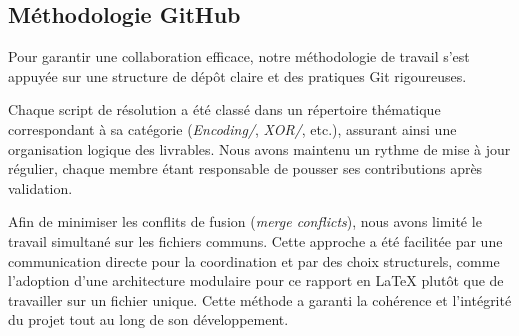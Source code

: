 \subsection{Méthodologie GitHub}

Pour garantir une collaboration efficace, notre méthodologie de travail s'est
appuyée sur une structure de dépôt claire et des pratiques Git rigoureuses.

Chaque script de résolution a été classé dans un répertoire thématique
correspondant à sa catégorie (\textit{Encoding/}, \textit{XOR/}, etc.),
assurant ainsi une organisation logique des livrables. Nous avons maintenu
un rythme de mise à jour régulier, chaque membre étant responsable de
pousser ses contributions après validation.

Afin de minimiser les conflits de fusion (\textit{merge conflicts}), nous avons
limité le travail simultané sur les fichiers communs. Cette approche a été
facilitée par une communication directe pour la coordination et par des
choix structurels, comme l'adoption d'une architecture modulaire pour ce
rapport en \LaTeX{} plutôt que de travailler sur un fichier unique. Cette
méthode a garanti la cohérence et l'intégrité du projet tout au long de son
développement.